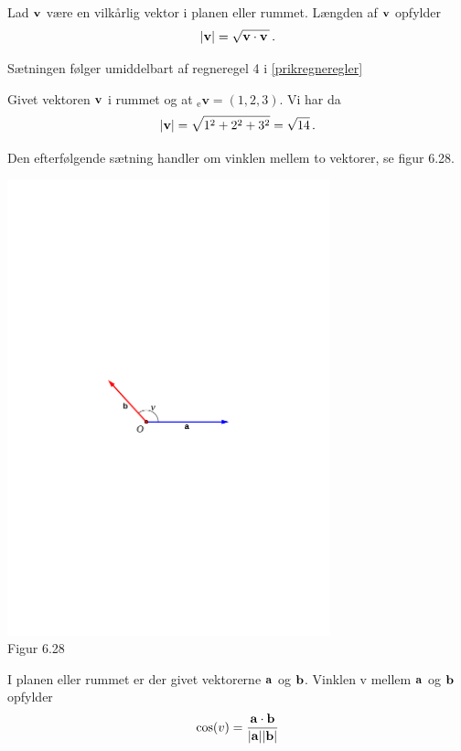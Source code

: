 \begin{theorem}
Lad $\mathbf{v}$ være en vilkårlig vektor i planen eller rummet. Længden af $\mathbf{v}$ opfylder
\begin{equation}
|\mathbf{v}|=\sqrt{\mathbf{v} \cdot \mathbf{v}\,}\,.
\end{equation}
\end{theorem}
\begin{bevis}
Sætningen følger umiddelbart af regneregel 4 i \ref{prikregneregler}
\end{bevis}
\begin{example}
Givet vektoren $\mathbf{v}$ i rummet og at ${_\mathrm{e}\mathbf{v}}=(1,2,3)$. Vi har da
$$
|\mathbf{v}|=\sqrt{1^2+2^2+3^2}=\sqrt{14}\,.
$$
\end{example}
Den efterfølgende sætning handler om vinklen mellem to vektorer, se figur 6.28.
\begin{center}
		\includegraphics[trim=1.4cm 12.5cm 1.4cm 12cm,width=0.70\textwidth,clip]{geometer/skalarprod.pdf}	
		\\Figur 6.28
\end{center} 
\begin{theorem}\label{vinkel}
I planen eller rummet er der givet vektorerne $\mathbf{a}$ og $\mathbf{b}$. Vinklen v mellem $\mathbf{a}$ og $\mathbf{b}$ opfylder
\begin{equation}
\cos(v)=\frac{\mathbf{a} \cdot \mathbf{b}}{|\mathbf{a}||\mathbf{b}|}
\end{equation}
\end{theorem}

